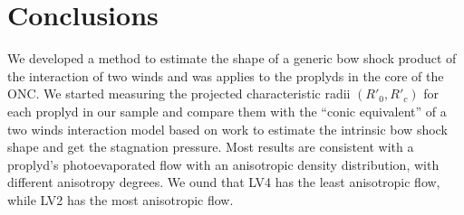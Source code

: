 \section{Conclusions}
\label{sec:conc}


We developed a method to estimate the shape of a generic bow shock product of the
interaction of two winds and was applies to the proplyds in the core of the ONC.
We started measuring the projected characteristic radii $(R'_0,R'_c)$ for each proplyd in our
sample and compare them with the ``conic equivalent'' of a two winds interaction model based 
on \CRW{} work to estimate the intrinsic bow shock shape and get the stagnation pressure.
Most results are consistent with a proplyd's photoevaporated flow with an anisotropic density
distribution, with different anisotropy degrees. We ound that LV4 has the least anisotropic flow,
while LV2 has the most anisotropic flow.

